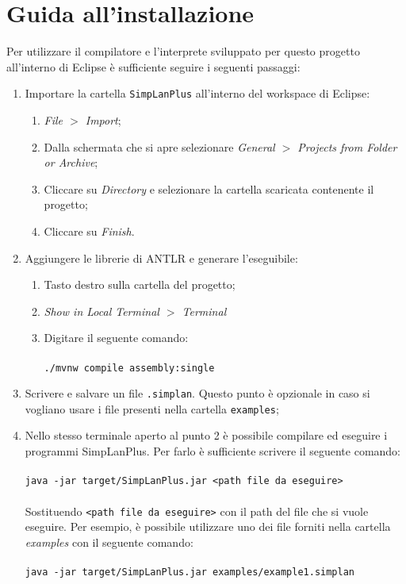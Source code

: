 \documentclass[../report.tex]{subfiles}
\begin{document}
\chapter{Guida all'installazione}\label{a:installazione}
Per utilizzare il compilatore e l'interprete sviluppato per questo progetto all'interno di Eclipse \`e sufficiente seguire i seguenti passaggi:
\begin{enumerate}
    \item Importare la cartella \verb|SimpLanPlus| all'interno del workspace di Eclipse:
        \begin{enumerate}
            \item \textit{File $>$ Import};
            \item Dalla schermata che si apre selezionare \textit{General $>$ Projects from Folder or Archive};
            \item Cliccare su \textit{Directory} e selezionare la cartella scaricata contenente il progetto;
            \item Cliccare su \textit{Finish}.
        \end{enumerate}
    \item Aggiungere le librerie di ANTLR e generare l'eseguibile:
            \begin{enumerate}
                \item Tasto destro sulla cartella del progetto;
                \item \textit{Show in Local Terminal $>$ Terminal}
                \item Digitare il seguente comando:\\\\
                    \verb|./mvnw compile assembly:single|
            \end{enumerate}
    \item Scrivere e salvare un file \verb|.simplan|. Questo punto \`e opzionale in caso si vogliano usare i file presenti nella cartella \verb|examples|;
    \item \label{a:pt4}Nello stesso terminale aperto al punto 2 \`e possibile compilare ed eseguire i programmi SimpLanPlus. Per farlo \`e sufficiente scrivere il seguente comando:\\\\
        \verb|java -jar target/SimpLanPlus.jar <path file da eseguire>|\\\\
        Sostituendo \verb|<path file da eseguire>| con il path del file che si vuole eseguire. Per esempio, \`e possibile utilizzare uno dei file forniti nella cartella \textit{examples} con il seguente comando:\\\\
        \verb|java -jar target/SimpLanPlus.jar examples/example1.simplan|
\end{enumerate}
\end{document}
